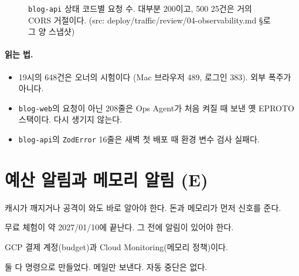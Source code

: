 \begin{figure}[H]
  \centering
  \caption{\texttt{blog-api} 상태 코드별 요청 수. 대부분 200이고, 500 25건은 거의 CORS 거절이다.
  (src: deploy/traffic/review/04-observability.md §로그 양 스냅샷)}\label{fig:06-api-status-chart}
\end{figure}

\paragraph{읽는 법.}
\begin{itemize}[nosep]
  \item 19시의 648건은 오너의 시험이다 (Mac 브라우저 489, 로그인 383). 외부 폭주가 아니다.
  \item \texttt{blog-web}의 요청이 아닌 208줄은 Ops Agent가 처음 켜질 때 보낸 옛 EPROTO 스택이다. 다시 생기지 않는다.
  \item \texttt{blog-api}의 \texttt{ZodError} 16줄은 새벽 첫 배포 때 환경 변수 검사 실패다.
\end{itemize}

\section{예산 알림과 메모리 알림 (E)}\label{sec:06-alerts}

\begin{inbrief}
  \item[Why] 캐시가 깨지거나 공격이 와도 바로 알아야 한다. 돈과 메모리가 먼저 신호를 준다.
  \item[When] 무료 체험이 약 2027/01/10에 끝난다. 그 전에 알림이 있어야 한다.
  \item[Where] GCP 결제 계정(budget)과 Cloud Monitoring(메모리 정책)이다.
  \item[How] 둘 다  명령으로 만들었다. 메일만 보낸다. 자동 중단은 없다.
\end{inbrief}


